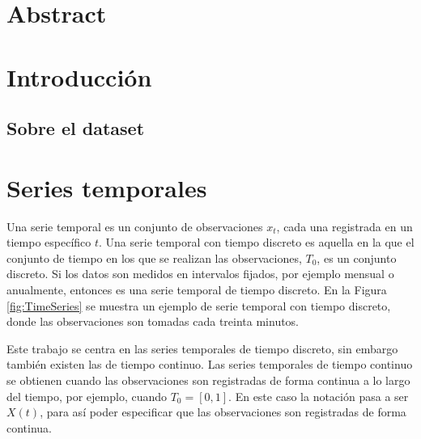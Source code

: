 \documentclass[12pt,twoside]{article}
\begin{document}
\newpage
\section*{Abstract}



\newpage
\tableofcontents




\newpage
\section{Introducción}

\subsection{Sobre el dataset}







\newpage
\section{Series temporales}
Una serie temporal es un conjunto de observaciones $x_t$, cada una registrada en un tiempo específico $t$. Una serie temporal con tiempo discreto es aquella en la que el conjunto de tiempo en los que se realizan las observaciones, $T_0$, es un conjunto discreto. Si los datos son medidos en intervalos fijados, por ejemplo mensual o anualmente, entonces es una serie temporal de tiempo discreto. En la Figura \ref{fig:TimeSeries} se muestra un ejemplo de serie temporal con tiempo discreto, donde las observaciones son tomadas cada treinta minutos. 

Este trabajo se centra en las series temporales de tiempo discreto, sin embargo también existen las de tiempo continuo. Las series temporales de tiempo continuo se obtienen cuando las observaciones son registradas de forma continua a lo largo del tiempo, por ejemplo, cuando $T_0 = [0,1]$. En este caso la notación pasa a ser $X(t)$, para así poder especificar que las observaciones son registradas de forma continua.
\end{document}
